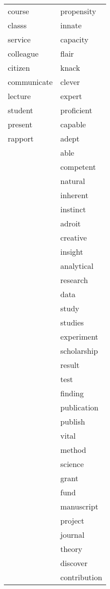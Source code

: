 \documentclass[12pt]{caltech_thesis}
\begin{document}
\begin{longtable}{l|l}
   course & propensity \\
   classs & innate \\
   service & capacity \\
   colleague & flair \\
   citizen & knack \\
   communicate & clever \\
   lecture & expert \\
   student & proficient \\
   present & capable \\
   rapport & adept \\ 
   &able \\
   &competent\\
   & natural \\
   &inherent\\
   & instinct \\
   & adroit \\
   &creative \\
   &insight \\
   &analytical\\
   & research \\
   &data \\
   &study \\
   &studies \\
   &experiment \\
   &scholarship \\
   &result \\
   &test\\
   & finding \\
   &publication\\
   & publish \\
   &vital \\
   &method\\
   & science \\
   &grant \\
   &fund \\
   &manuscript \\
   &project \\
   & journal \\
   & theory \\\
   &discover \\
   &contribution \\ \hline  
   \end{longtable}
   \restoregeometry
   
\end{document}
